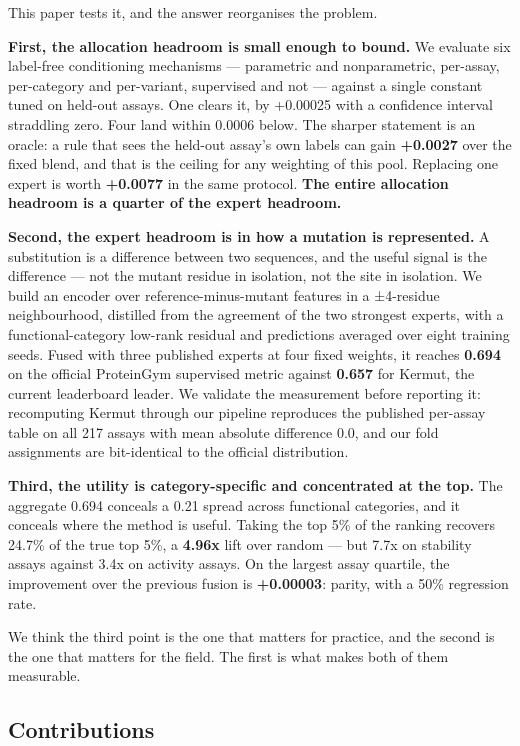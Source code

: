 \documentclass[sigconf,review,nonacm]{acmart}
\begin{document}
This paper tests it, and the answer reorganises the problem.

\textbf{First, the allocation headroom is small enough to bound.} We evaluate six label-free conditioning
mechanisms --- parametric and nonparametric, per-assay, per-category and per-variant, supervised and not ---
against a single constant tuned on held-out assays. One clears it, by +0.00025 with a confidence
interval straddling zero. Four land within 0.0006 below. The sharper statement is an oracle: a rule that
sees the held-out assay's own labels can gain \textbf{+0.0027} over the fixed blend, and that is the ceiling
for any weighting of this pool. Replacing one expert is worth \textbf{+0.0077} in the same protocol. \textbf{The
entire allocation headroom is a quarter of the expert headroom.}

\textbf{Second, the expert headroom is in how a mutation is represented.} A substitution is a difference
between two sequences, and the useful signal is the difference --- not the mutant residue in isolation, not
the site in isolation. We build an encoder over reference-minus-mutant features in a ±4-residue
neighbourhood, distilled from the agreement of the two strongest experts, with a functional-category
low-rank residual and predictions averaged over eight training seeds. Fused with three published experts
at four fixed weights, it reaches \textbf{0.694} on the official ProteinGym supervised metric against
\textbf{0.657} for Kermut, the current leaderboard leader. We validate the measurement before reporting it:
recomputing Kermut through our pipeline reproduces the published per-assay table on all 217 assays with
mean absolute difference 0.0, and our fold assignments are bit-identical to the official distribution.

\textbf{Third, the utility is category-specific and concentrated at the top.} The aggregate 0.694 conceals
a 0.21 spread across functional categories, and it conceals where the method is useful. Taking the top
5\% of the ranking recovers 24.7\% of the true top 5\%, a \textbf{4.96x} lift over random --- but 7.7x on
stability assays against 3.4x on activity assays. On the largest assay quartile, the improvement over
the previous fusion is \textbf{+0.00003}: parity, with a 50\% regression rate.

We think the third point is the one that matters for practice, and the second is the one that matters
for the field. The first is what makes both of them measurable.

\hypertarget{contributions}{%
\subsection{Contributions}\label{contributions}}
\end{document}
